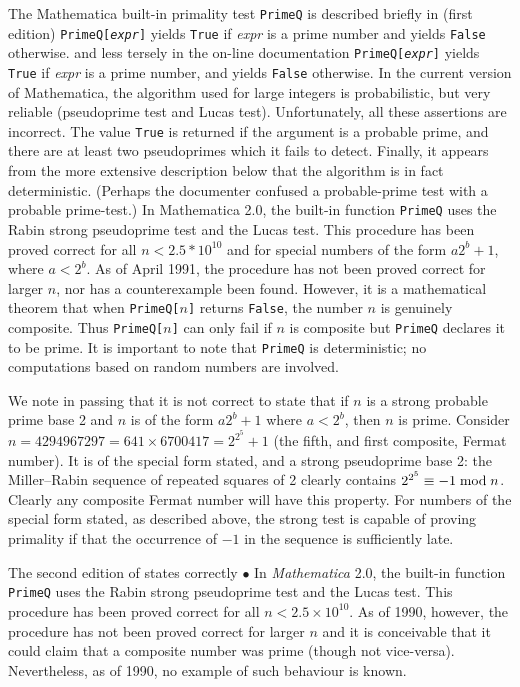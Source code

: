 The Mathematica built-in primality test {\tt PrimeQ} is described
briefly in \cite{45} (first edition)
\block
{\tt PrimeQ[{\it expr}]} yields {\tt True} if {\it expr} is a prime number
and yields {\tt False} otherwise.
\endblock
and less tersely in the on-line documentation
\block
{\tt PrimeQ[{\it expr}]} yields {\tt True} if {\it expr} is a prime number, and yields {\tt False}
otherwise. In the current version of Mathematica, the algorithm used for
large integers is probabilistic, but very reliable (pseudoprime test and
Lucas test).
\endblock
Unfortunately, all these assertions are incorrect.
The value {\tt True} is returned
if the argument is a probable prime, and there are at least two pseudoprimes
which it fails to detect.  Finally, it appears from the more extensive
description \cite{13} below that the algorithm is in fact deterministic.
(Perhaps the documenter confused a probable-prime test with a probable
prime-test.)
\block
In Mathematica 2.0, the built-in function {\tt PrimeQ} uses the Rabin
strong pseudoprime test and the Lucas test. This procedure has been
proved correct for all $n < 2.5*10^{10}$ and for special numbers of
the form $a 2^b + 1$, where $a < 2^b$. As of April 1991, the procedure
has not been proved correct for larger $n$, nor has a counterexample
been found. However, it is a mathematical theorem that when {\tt PrimeQ[$n$]}
returns {\tt False}, the number $n$ is genuinely composite. Thus {\tt PrimeQ[$n$]}
can only fail if $n$ is composite but {\tt PrimeQ} declares it to be prime.
It is important to note that {\tt PrimeQ} is deterministic; no computations
based on random numbers are involved.
\endblock

We note in passing that it is not correct to state that if $n$ is a strong
probable prime base 2 and $n$ is of the form $a 2^b + 1$ where $a < 2^b$, then
$n$ is prime.  Consider $n = 4294967297 = 641 \times 6700417 = 2^{2^5} + 1$
(the fifth, and first composite, Fermat number).  It is of the special
form stated, and a strong pseudoprime base 2: the Miller--Rabin
sequence of repeated squares of 2 clearly contains $2^{2^5} \equiv -1 \bmod n$.
Clearly any composite Fermat number will have this property.  
For numbers of the special form stated, as described above, the strong test 
is capable of proving primality if that the occurrence of $-1$ in the sequence 
is sufficiently late.

The second edition of \cite{45} states correctly
\block
$\bullet$  In {\it Mathematica} 2.0, the built-in function {\tt PrimeQ} uses the Rabin
strong pseudoprime test and the Lucas test. This procedure has been
proved correct for all $n < 2.5 \times 10^{10}$.  As of 1990, however,
the procedure has not been proved correct for larger $n$ and it is conceivable
that it could claim that a composite number was prime (though not vice-versa).
Nevertheless, as of 1990, no example of such behaviour is known.
\endblock

